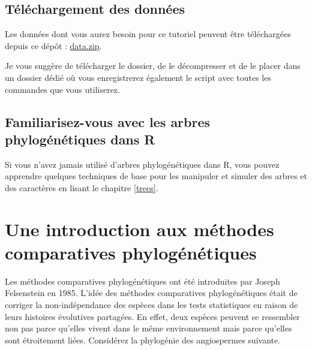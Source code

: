 \documentclass[
]{book}
\begin{document}
\section{Téléchargement des données}\label{download}

Les données dont vous aurez besoin pour ce tutoriel peuvent être téléchargées depuis ce dépôt : \href{https://simjoly.github.io/ComparativeMethods-HalfDayWorkshop/data.zip}{data.zip}.

Je vous suggère de télécharger le dossier, de le décompresser et de le placer dans un dossier dédié où vous enregistrerez également le script avec toutes les commandes que vous utiliserez.

\section{Familiarisez-vous avec les arbres phylogénétiques dans R}\label{familiarisez-vous-avec-les-arbres-phyloguxe9nuxe9tiques-dans-r}

Si vous n'avez jamais utilisé d'arbres phylogénétiques dans R, vous pouvez apprendre quelques techniques de base pour les manipuler et simuler des arbres et des caractères en lisant le chapitre \ref{trees}.

\chapter{Une introduction aux méthodes comparatives phylogénétiques}\label{intro}

Les méthodes comparatives phylogénétiques ont été introduites par Joseph Felsenstein en 1985. L'idée des méthodes comparatives phylogénétiques était de corriger la non-indépendance des espèces dans les tests statistiques en raison de leurs histoires évolutives partagées. En effet, deux espèces peuvent se ressembler non pas parce qu'elles vivent dans le même environnement mais parce qu'elles sont étroitement liées. Considérez la phylogénie des angiospermes suivante.
\end{document}
